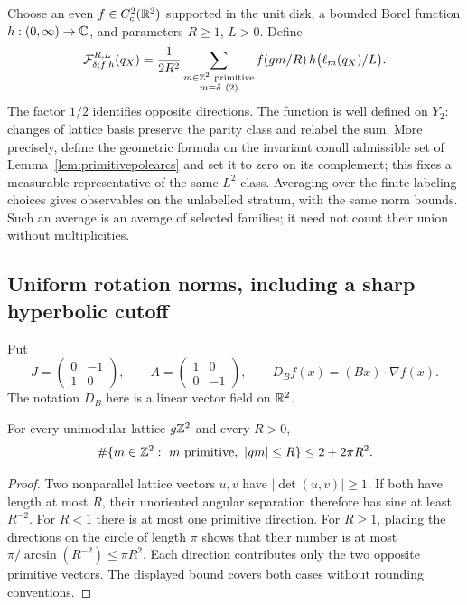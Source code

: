 Choose an even $f\in C_c^2(\mathbb R^2)$ supported in the unit disk, a bounded
Borel function $h:(0,\infty)\to\mathbb C$, and parameters $R\geq1$, $L>0$.
Define
\begin{equation}
 \mathcal F_{\delta;f,h}^{R,L}(q_X)
  =\frac1{2R^2}
    \sum_{\substack{m\in\mathbb Z^2\ \mathrm{primitive}\\m\equiv\delta\ (2)}}
       f(gm/R)\,h\bigl(\ell_m(q_X)/L\bigr).
 \label{eq:polearcobservable}
\end{equation}
The factor $1/2$ identifies opposite directions. The function is
well defined on $Y_2$: changes of lattice basis preserve the parity
class and relabel the sum. More precisely, define the geometric formula
on the invariant conull admissible set of
Lemma~\ref{lem:primitivepolearcs} and set it to zero on its complement;
this fixes a measurable representative of the same $L^2$ class.
Averaging over the finite labeling choices
gives observables on the unlabelled stratum, with the same norm bounds.
Such an average is an average of selected families; it need not count
their union without multiplicities.

\subsection{Uniform rotation norms, including a sharp hyperbolic cutoff}
\label{subsec:polearcnorms}

Put
\[
 J=\begin{pmatrix}0&-1\\1&0\end{pmatrix},\qquad
 A=\begin{pmatrix}1&0\\0&-1\end{pmatrix},\qquad
 D_Bf(x)=(Bx)\cdot\nabla f(x).
\]
The notation $D_B$ here is a linear vector field on $\mathbb R^2$.

\begin{lemma}
\label{lem:polearcprimitivebound}
For every unimodular lattice $g\mathbb Z^2$ and every $R>0$,
\begin{equation}
 \#\{m\in\ZZ^2:\ m\ \mathrm{primitive},\ |gm|\leq R\}
 \leq 2+2\pi R^2.
 \label{eq:polearcprimitivebound}
\end{equation}
\end{lemma}

\begin{proof}
Two nonparallel lattice vectors $u,v$ have $|\det(u,v)|\geq1$.
If both have length at most $R$, their unoriented angular separation
therefore has sine at least $R^{-2}$. For $R<1$ there is at most one
primitive direction. For $R\geq1$, placing the directions on the circle
of length $\pi$ shows that their number is at most
$\pi/\arcsin(R^{-2})\leq\pi R^2$. Each direction contributes only
the two opposite primitive vectors. The displayed bound covers both
cases without rounding conventions.
\end{proof}

